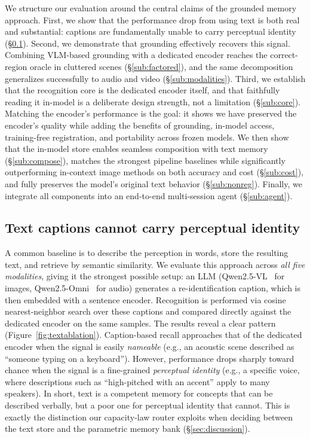 We structure our evaluation around the central claims of the grounded memory approach. First, we show that the performance drop from using text is both real and substantial: captions are fundamentally unable to carry perceptual identity (\S\ref{sub:textcant}). Second, we demonstrate that grounding effectively recovers this signal. Combining VLM-based grounding with a dedicated encoder reaches the correct-region oracle in cluttered scenes (\S\ref{sub:factored}), and the same decomposition generalizes successfully to audio and video (\S\ref{sub:modalities}). Third, we establish that the recognition core is the dedicated encoder itself, and that faithfully reading it in-model is a deliberate design strength, not a limitation (\S\ref{sub:core}). Matching the encoder's performance is the goal: it shows we have preserved the encoder's quality while adding the benefits of grounding, in-model access, training-free registration, and portability across frozen models. We then show that the in-model store enables seamless composition with text memory (\S\ref{sub:compose}), matches the strongest pipeline baselines while significantly outperforming in-context image methods on both accuracy and cost (\S\ref{sub:cost}), and fully preserves the model's original text behavior (\S\ref{sub:nonreg}). Finally, we integrate all components into an end-to-end multi-session agent (\S\ref{sub:agent}).

\subsection{Text captions cannot carry perceptual identity}
\label{sub:textcant}

A common baseline is to describe the perception in words, store the resulting text, and retrieve by semantic similarity. We evaluate this approach across \emph{all five modalities}, giving it the strongest possible setup: an LLM (Qwen2.5-VL~\citep{qwen25vl} for images, Qwen2.5-Omni~\citep{qwen25omni} for audio) generates a re-identification caption, which is then embedded with a sentence encoder. Recognition is performed via cosine nearest-neighbor search over these captions and compared directly against the dedicated encoder on the same samples. The results reveal a clear pattern (Figure~\ref{fig:textablation}). Caption-based recall approaches that of the dedicated encoder when the signal is easily \emph{nameable} (e.g., an acoustic scene described as ``someone typing on a keyboard''). However, performance drops sharply toward chance when the signal is a fine-grained \emph{perceptual identity} (e.g., a specific voice, where descriptions such as ``high-pitched with an accent'' apply to many speakers). In short, text is a competent memory for concepts that can be described verbally, but a poor one for perceptual identity that cannot. This is exactly the distinction our capacity-law router exploits when deciding between the text store and the parametric memory bank (\S\ref{sec:discussion}).

